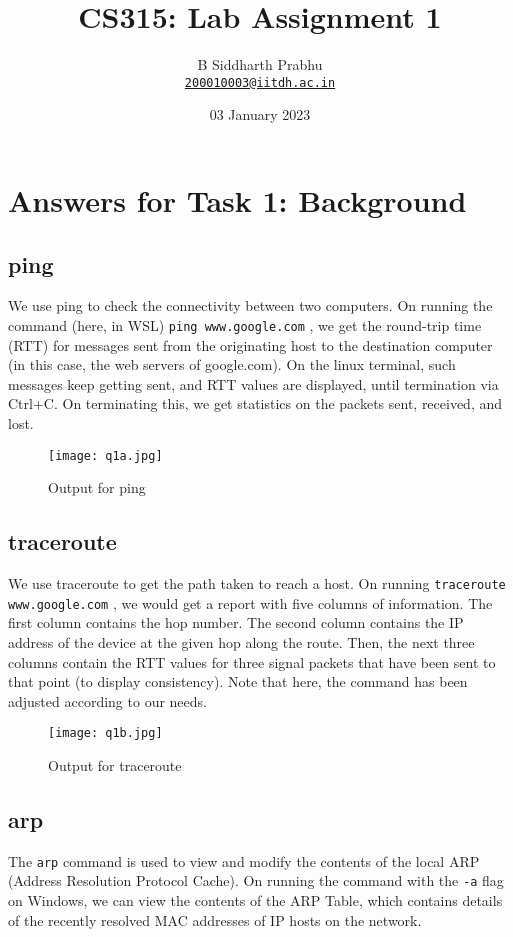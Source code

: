 \documentclass{article}
\title{CS315: Lab Assignment 1}
\author{
  B Siddharth Prabhu\\
  \href{mailto:200010003@iitdh.ac.in}{\texttt{200010003@iitdh.ac.in}}
  }
\date{03 January 2023}
\let\oldtexttt\texttt
\renewcommand{\texttt}[1]{
  \colorbox{bgcolor}{\oldtexttt{#1}}
  }
\begin{document}
\maketitle

\section{Answers for Task 1: Background}
\subsection{ping}
We use ping to check the connectivity between two computers. On running the command (here, in WSL) \texttt{ping www.google.com}, we get the round-trip time (RTT) for messages sent from the originating host to the destination computer (in this case, the web servers of google.com). On the linux terminal, such messages keep getting sent, and RTT values are displayed, until termination via Ctrl+C. On terminating this, we get statistics on the packets sent, received, and lost.

\begin{figure}[!hbt]
    \centering
    \texttt{[image: q1a.jpg]}
    \caption{Output for ping}
    \label{fig:my_label1}
\end{figure}

\subsection{traceroute}
We use traceroute to get the path taken to reach a host. On running \texttt{traceroute www.google.com}, we would get a report with five columns of information. The first column contains the hop number. The second column contains the IP address of the device at the given hop along the route. Then, the next three columns contain the RTT values for three signal packets that have been sent to that point (to display consistency). Note that here, the command has been adjusted according to our needs.

\begin{figure}[!hbt]
    \centering
    \texttt{[image: q1b.jpg]}
    \caption{Output for traceroute}
    \label{fig:my_label2}
\end{figure}

\newpage
\subsection{arp}
The \texttt{arp} command is used to view and modify the contents of the local ARP (Address Resolution Protocol Cache). On running the command with the \texttt{-a} flag on Windows, we can view the contents of the ARP Table, which contains details of the recently resolved MAC addresses of IP hosts on the network.
\end{document}
